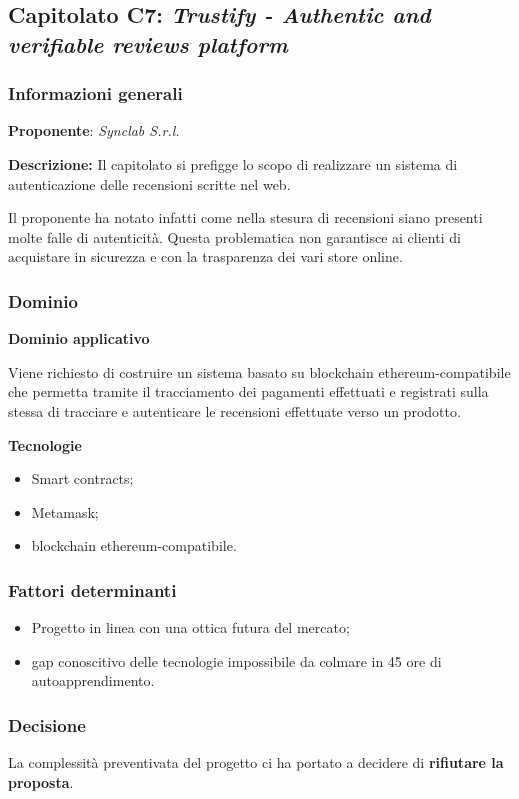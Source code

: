 \subsection{Capitolato C7: \textit{Trustify - Authentic and verifiable reviews platform }}
\subsubsection{Informazioni generali}

\textbf{Proponente}: \textit{Synclab S.r.l.} 

\textbf{Descrizione:}
Il capitolato si prefigge lo scopo di realizzare un sistema di autenticazione delle recensioni scritte nel web.

Il proponente ha notato infatti come nella stesura di recensioni siano presenti molte falle di autenticità. Questa problematica non garantisce ai clienti di acquistare in sicurezza e con la trasparenza dei vari store online.

\subsubsection{Dominio}

\textbf{Dominio applicativo} 

Viene richiesto di costruire un sistema basato su blockchain ethereum-compatibile che permetta tramite il tracciamento dei pagamenti effettuati e registrati sulla stessa di tracciare e autenticare le recensioni effettuate verso un prodotto.

\textbf{Tecnologie}

\begin{itemize}
    \item Smart contracts;
    \item Metamask;
    \item blockchain ethereum-compatibile. 
\end{itemize}

\subsubsection{Fattori determinanti}
\begin{itemize}
    \item Progetto in linea con una ottica futura del mercato;
    \item gap conoscitivo delle tecnologie impossibile da colmare in 45 ore di autoapprendimento.
\end{itemize}
\subsubsection{Decisione}

La complessità preventivata del progetto ci ha portato a decidere di \textbf{rifiutare la proposta}.
